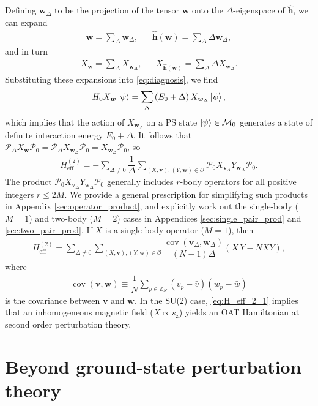 \documentclass[nofootinbib,notitlepage,11pt]{revtex4-2}
\renewcommand{\t}{\text} %
\newcommand{\f}[2]{\dfrac{#1}{#2}} %
\newcommand{\p}[1]{\left(#1\right)} %
\newcommand{\m}{\bm} %
\newcommand{\1}{\mathds{1}}
\newcommand{\z}{\text{z}}
\newcommand{\M}{\mathcal{M}}
\renewcommand{\O}{\mathcal{O}}
\renewcommand{\P}{\mathcal{P}}
\newcommand{\ZZ}{\mathbb{Z}}
\newcommand{\col}{\underline}
\DeclareMathOperator{\cov}{cov}
\begin{document}
Defining $\m w_\Delta$ to be the projection of the tensor $\m w$ onto
the $\Delta$-eigenspace of $\hat{\m h}$, we can expand
\begin{align}
  \m w = \sum_\Delta \m w_\Delta,
  &&
  \hat{\m h}\p{\m w} = \sum_\Delta \Delta \m w_\Delta,
\end{align}
and in turn
\begin{align}
  X_{\m w} = \sum_\Delta X_{\m w_\Delta},
  &&
  X_{\hat{\m h}\p{\m w}} = \sum_\Delta \Delta X_{\m w_\Delta}.
\end{align}
Substituting these expansions into \eqref{eq:diagnosis}, we find
\begin{align}
  H_0 X_{\m w} \ket\psi
  = \sum_\Delta\p{E_0 + \Delta} X_{\m w_\Delta} \ket\psi,
\end{align}
which implies that the action of $X_{\m w_\Delta}$ on a PS state
$\ket\psi\in\M_0$ generates a state of definite interaction energy
$E_0+\Delta$.  It follows that
$\P_\Delta X_{\m w} \P_0 = \P_\Delta X_{\m w_\Delta} \P_0 =
X_{\m{w}_\Delta} \P_0$, so
\begin{align}
  H_{\t{eff}}^{(2)} = -\sum_{\Delta\ne0} \f1\Delta
  \sum_{\p{X,\m v},\p{Y,\m w}\in\O}
  \P_0 X_{\m v_\Delta} Y_{\m w_\Delta} \P_0.
\end{align}
The product $\P_0 X_{\m v_\Delta} Y_{\m w_\Delta} \P_0$ generally
includes $r$-body operators for all positive integers $r\le2M$.  We
provide a general prescription for simplifying such products in
Appendix \ref{sec:operator_product}, and explicitly work out the
single-body ($M=1$) and two-body ($M=2$) cases in Appendices
\ref{sec:single_pair_prod} and \ref{sec:two_pair_prod}.  If $X$ is a
single-body operator ($M=1$), then
\begin{align}
  H_{\t{eff}}^{(2)}
  = \sum_{\Delta\ne0} \sum_{\p{X,\m v},\p{Y,\m w}\in\O}
  \f{\cov\p{\m v_\Delta,\m w_\Delta}}{\p{N-1}\Delta}
  \p{\col{X}\,\col{Y} - N \col{XY}},
  \label{eq:H_eff_2_1}
\end{align}
where
\begin{align}
  \cov\p{\m v,\m w} \equiv
  \f1N \sum_{p\in\ZZ_N} \p{v_p-\bar v}\p{w_p-\bar w}
\end{align}
is the covariance between $\m v$ and $\m w$.  In the SU(2) case,
\eqref{eq:H_eff_2_1} implies that an inhomogeneous magnetic field
($X\propto s_\z$) yields an OAT Hamiltonian at second order
perturbation theory.

\section{Beyond ground-state perturbation theory}
\label{eq:excited_states}
\end{document}
